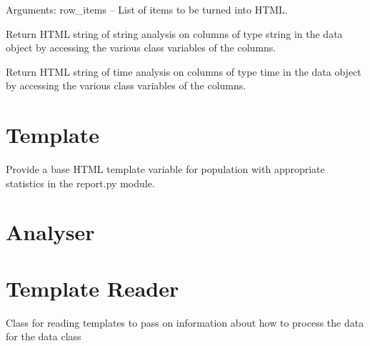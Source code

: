 \documentclass[letterpaper,10pt,english]{sphinxmanual}
\begin{document}
\begin{fulllineitems}
\begin{fulllineitems}
Arguments:
row\_items -- List of items to be turned into HTML.

\end{fulllineitems}


\begin{fulllineitems}
\label{Code_rst/rep:report.Report.string_analysis}
Return HTML string of string analysis on columns of type string 
in the data object by accessing the various class variables of the
columns.

\end{fulllineitems}


\begin{fulllineitems}
\label{Code_rst/rep:report.Report.time_analysis}
Return HTML string of time analysis on columns of type time 
in the data object by accessing the various class variables of the
columns.

\end{fulllineitems}


\end{fulllineitems}



\section{Template}
\label{Code_rst/templ:module-template}\label{Code_rst/templ:template}\label{Code_rst/templ::doc}
Provide a base HTML template variable for population with appropriate
statistics in the report.py module.


\section{Analyser}
\label{Code_rst/analy::doc}\label{Code_rst/analy:analyser}

\section{Template Reader}
\label{Code_rst/temp_rd:template-reader}\label{Code_rst/temp_rd::doc}\label{Code_rst/temp_rd:module-template_reader}
Class for reading templates to pass on information about how
to process the data for the data class
\end{document}
